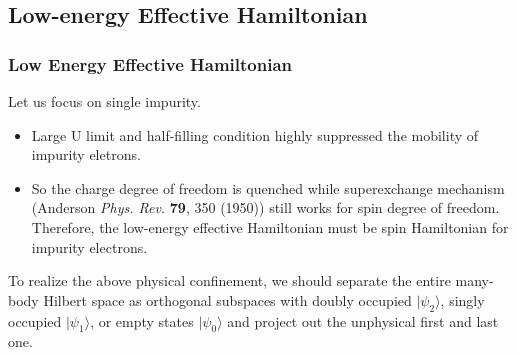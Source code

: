 \documentclass[10pt,aspectratio=43,xcolor=x11names]{beamer}%
\begin{document}
	\subsection{Low-energy Effective Hamiltonian}		
		\begin{frame}\frametitle{Low Energy Effective Hamiltonian}
			Let us focus on single impurity.
			\begin{itemize}
				\item Large U limit and half-filling condition highly suppressed the mobility of impurity eletrons.
				\item So the charge degree of freedom is quenched while {\color{blue}superexchange mechanism} (Anderson \textit{Phys. Rev.} \textbf{79}, 350 (1950)) still works for spin degree of freedom. Therefore, the low-energy effective Hamiltonian must be spin Hamiltonian for impurity electrons.  
			\end{itemize}
			\pause
			To realize the above physical confinement, we should separate the entire many-body Hilbert space as orthogonal subspaces with doubly occupied $|\psi_2\rangle$, singly occupied $|\psi_1\rangle$, or empty states $|\psi_0\rangle$ and {\color{blue}project out the unphysical first and last one}.
		\end{frame}
\end{document}
